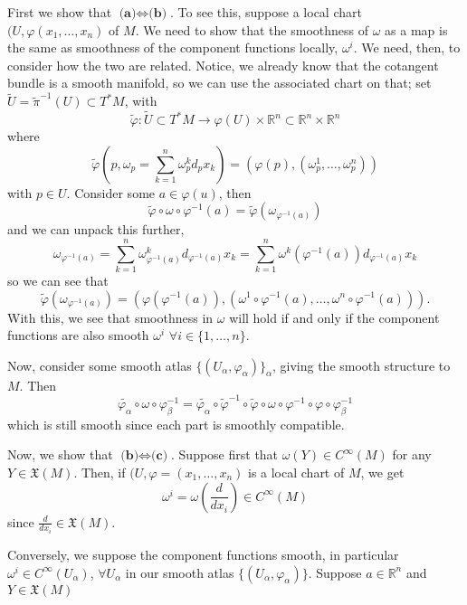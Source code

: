 \documentclass[10pt]{article}
\newcommand{\R}{\mathbb{R}}
\newcommand{\del}[2][]{\frac{d #1}{d #2}}
\begin{document}
First we show that $\textbf{(a)}\iff\textbf{(b)}$. To see this, suppose a local chart $(U,\varphi(x_{1},\dots,x_{n})$ of $M$. We need to show that the smoothness of $\omega$ as a map is the same as smoothness of the component functions locally, $\omega^{i}$. We need, then, to consider how the two are related. Notice, we already know that the cotangent bundle is a smooth manifold, so we can use the associated chart on that; set $\tilde{U} = \tilde{\pi}^{-1}(U)\subset T^{*}M$, with 
\[ \tilde{\varphi}: \tilde{U}\subset T^{*}M \to \varphi(U)\times \R^{n} \subset \R^{n}\times\R^{n} \]
where
\[\tilde{\varphi}(p, \omega_{p} = \sum_{k=1}^{n}\omega_{p}^{k}d_{p}x_{k}) = (\varphi(p),(\omega_{p}^{1},\dots,\omega_{p}^{n}))\]
with $p\in U$. Consider some $a\in \varphi(u)$, then
\[ \tilde{\varphi}\circ\omega\circ \varphi^{-1}(a) = \tilde{\varphi}(\omega_{\varphi^{-1}(a)}) \]
and we can unpack this further,
\[ \omega_{\varphi^{-1}(a)} = \sum_{k=1}^{n} \omega_{\varphi^{-1}(a)}^{k}d_{\varphi^{-1}(a)}x_{k} = \sum_{k=1}^{n} \omega^{k}(\varphi^{-1}(a))d_{\varphi^{-1}(a)}x_{k}\]
so we can see that
\[ \tilde{\varphi}(\omega_{\varphi^{-1}(a)}) = (\varphi(\varphi^{-1}(a)), (\omega^{1}\circ \varphi^{-1}(a), \dots, \omega^{n}\circ \varphi^{-1}(a))). \]
With this, we see that smoothness in $\omega$ will hold if and only if the component functions are also smooth $\omega^{i}$ $\forall i \in \{1,\dots,n\}$.

Now, consider some smooth atlas $\{(U_{\alpha},\varphi_{\alpha})\}_{\alpha}$, giving the smooth structure to $M$. Then
\[ \tilde{\varphi_{\alpha}}\circ \omega \circ \varphi_{\beta}^{-1} = \tilde{\varphi_{\alpha}}\circ \tilde{\varphi}^{-1}\circ\tilde{\varphi}\circ\omega \circ\varphi^{-1}\circ\varphi\circ \varphi_{\beta}^{-1}\]
which is still smooth since each part is smoothly compatible.

Now, we show that $\textbf{(b)}\iff\textbf{(c)}$. Suppose first that $\omega(Y)\in C^{\infty}(M)$ for any $Y\in \mathfrak{X}(M)$. Then, if $(U,\varphi = (x_{1},\dots,x_{n})$ is a local chart of $M$, we get
\[ \omega^{i} = \omega\left(\del{x_{i}}\right) \in C^{\infty}(M) \]
since $\del{x_{i}}\in \mathfrak{X}(M)$.

Conversely, we suppose the component functions smooth, in particular $\omega^{i}\in C^{\infty}(U_{\alpha})$, $\forall U_{\alpha}$ in our smooth atlas $\{(U_{\alpha},\varphi_{\alpha})\}$. Suppose $a\in \R^{n}$ and $Y\in \mathfrak{X}(M)$



\end{document}

